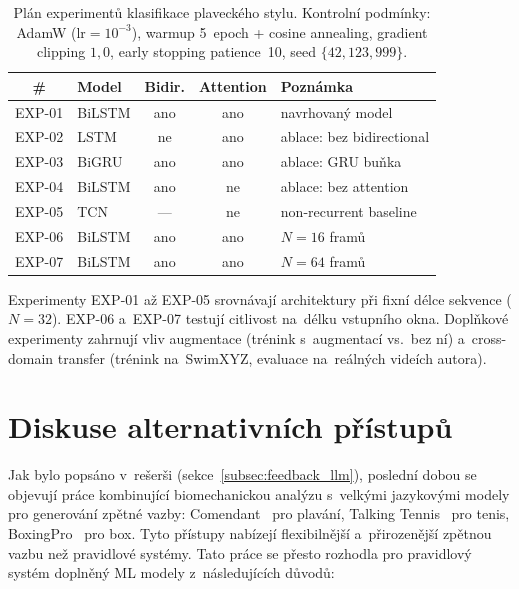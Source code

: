 \begin{table}[htbp]
\centering
\caption{Plán experimentů klasifikace plaveckého stylu. Kontrolní podmínky: AdamW ($\mathrm{lr} = 10^{-3}$), warmup 5~epoch + cosine annealing, gradient clipping $1{,}0$, early stopping patience~10, seed $\{42, 123, 999\}$.}
\label{tab:exp_plan}
\small
\begin{tabular}{clccl}
\toprule
\textbf{\#} & \textbf{Model} & \textbf{Bidir.} & \textbf{Attention} & \textbf{Poznámka} \\
\midrule
EXP-01 & BiLSTM  & ano & ano & navrhovaný model \\
EXP-02 & LSTM    & ne  & ano & ablace: bez bidirectional \\
EXP-03 & BiGRU   & ano & ano & ablace: GRU buňka \\
EXP-04 & BiLSTM  & ano & ne  & ablace: bez attention \\
EXP-05 & TCN     & --- & ne  & non-recurrent baseline \\
EXP-06 & BiLSTM  & ano & ano & $N = 16$ framů \\
EXP-07 & BiLSTM  & ano & ano & $N = 64$ framů \\
\bottomrule
\end{tabular}
\end{table}

Experimenty EXP-01 až EXP-05 srovnávají architektury při fixní délce sekvence ($N = 32$). EXP-06 a~EXP-07 testují citlivost na~délku vstupního okna. Doplňkové experimenty zahrnují vliv augmentace (trénink s~augmentací vs.~bez ní) a~cross-domain transfer (trénink na~SwimXYZ, evaluace na~reálných videích autora).

\section{Diskuse alternativních přístupů}
\label{sec:diskuse_alternativ}

Jak bylo popsáno v~rešerši (sekce~\ref{subsec:feedback_llm}), poslední dobou se objevují práce kombinující biomechanickou analýzu s~velkými jazykovými modely pro generování zpětné vazby: Comendant~\cite{comendant2024} pro plavání, Talking Tennis~\cite{talha2025} pro tenis, BoxingPro~\cite{boxingpro2024} pro box. Tyto přístupy nabízejí flexibilnější a~přirozenější zpětnou vazbu než pravidlové systémy. Tato práce se přesto rozhodla pro pravidlový systém doplněný ML modely z~následujících důvodů:

